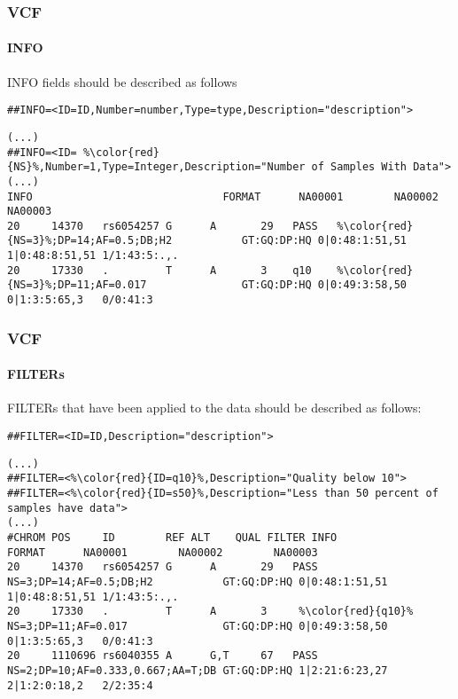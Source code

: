 \documentclass{beamer}
\begin{document}
\begin{frame}[fragile]
\frametitle{VCF}
\framesubtitle{INFO}

INFO fields should be described as follows
\begin{lstlisting}[breaklines=true]
##INFO=<ID=ID,Number=number,Type=type,Description="description">
\end{lstlisting}

\begin{lstlisting}[basicstyle=\tiny,breaklines=false,escapechar=\%]
(...)
##INFO=<ID= %\color{red}{NS}%,Number=1,Type=Integer,Description="Number of Samples With Data">
(...)
INFO                              FORMAT      NA00001        NA00002        NA00003
20     14370   rs6054257 G      A       29   PASS   %\color{red}{NS=3}%;DP=14;AF=0.5;DB;H2           GT:GQ:DP:HQ 0|0:48:1:51,51 1|0:48:8:51,51 1/1:43:5:.,.
20     17330   .         T      A       3    q10    %\color{red}{NS=3}%;DP=11;AF=0.017               GT:GQ:DP:HQ 0|0:49:3:58,50 0|1:3:5:65,3   0/0:41:3
\end{lstlisting}
\end{frame}

\begin{frame}[fragile]
\frametitle{VCF}
\framesubtitle{FILTERs}
FILTERs that have been applied to the data should be described as follows:
\begin{lstlisting}[breaklines=true]
##FILTER=<ID=ID,Description="description">
\end{lstlisting}

\begin{lstlisting}[basicstyle=\tiny,breaklines=false,escapechar=\%]
(...)
##FILTER=<%\color{red}{ID=q10}%,Description="Quality below 10">
##FILTER=<%\color{red}{ID=s50}%,Description="Less than 50 percent of samples have data">
(...)
#CHROM POS     ID        REF ALT    QUAL FILTER INFO                              FORMAT      NA00001        NA00002        NA00003
20     14370   rs6054257 G      A       29   PASS   NS=3;DP=14;AF=0.5;DB;H2           GT:GQ:DP:HQ 0|0:48:1:51,51 1|0:48:8:51,51 1/1:43:5:.,.
20     17330   .         T      A       3     %\color{red}{q10}%    NS=3;DP=11;AF=0.017               GT:GQ:DP:HQ 0|0:49:3:58,50 0|1:3:5:65,3   0/0:41:3
20     1110696 rs6040355 A      G,T     67   PASS   NS=2;DP=10;AF=0.333,0.667;AA=T;DB GT:GQ:DP:HQ 1|2:21:6:23,27 2|1:2:0:18,2   2/2:35:4
\end{lstlisting}
\end{frame}
\end{document}
